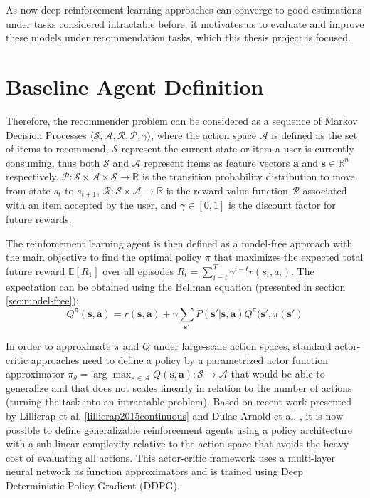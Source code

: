 As now deep reinforcement learning approaches can converge to good estimations under tasks considered intractable before, it motivates us to evaluate and improve these models under recommendation tasks, which this thesis project is focused.

\section{Baseline Agent Definition}
\label{sec:baseline}

Therefore, the recommender problem can be considered as a sequence of Markov Decision Processes $\langle \mathcal{S}, \mathcal{A}, \mathcal{R}, \mathcal{P}, \gamma \rangle$, where the action space $\mathcal{A}$ is defined as the set of items to recommend, $\mathcal{S}$ represent the current state or item a user is currently consuming, thus both $\mathcal{S}$ and $\mathcal{A}$ represent items as feature vectors $\mathbf{a}$ and $\mathbf{s} \in \mathbb{R}^n$ respectively. $\mathcal{P}: \mathcal{S} \times \mathcal{A} \times \mathcal{S} \rightarrow \mathbb{R}$ is the transition probability distribution to move from state ${s_t}$ to $s_{t+1}$,  $\mathcal{R}: \mathcal{S} \times \mathcal{A} \rightarrow \mathbb{R}$ is the reward value function $\mathcal{R}$ associated with an item accepted by the user, and $\gamma \in [0, 1]$ is the discount factor for future rewards. 

The reinforcement learning agent is then defined as a model-free approach with the main objective to find the optimal policy $\pi$ that maximizes the expected total future reward $\mathbb{E}[R_1]$ over all episodes $R_t = \sum^{T}_{i=t} \gamma^{i-t}r(s_i, a_i)$. The expectation can be obtained using the Bellman equation (presented in section \ref{sec:model-free}): 
\begin{equation}
Q^{\pi}(\mathbf{s}, \mathbf{a}) = r(\mathbf{s}, \mathbf{a}) + \gamma \sum_{\mathbf{s}'}P(\mathbf{s}'|\mathbf{s}, \mathbf{a}) Q^{\pi}(\mathbf{s}', \pi(\mathbf{s}')
\end{equation}

In order to approximate $\pi$ and $Q$ under large-scale action spaces, standard actor-critic approaches need to define a policy by a parametrized actor function approximator $\pi_{\theta} = \arg\max_{\mathbf{a \in \mathcal{A}}} Q(\mathbf{s}, \mathbf{a}) : \mathcal{S} \rightarrow \mathcal{A}$ that would be able to generalize and that does not scales linearly in relation to the number of actions (turning the task into an intractable problem). Based on recent work presented by Lillicrap et al. \ref{lillicrap2015continuous} and Dulac-Arnold et al. \cite{Dulac-Arnold2015}, it is now possible to define generalizable reinforcement agents using a policy architecture with a sub-linear complexity relative to the action space that avoids the heavy cost of evaluating all actions. This actor-critic framework uses a multi-layer neural network as function approximators and is trained using Deep Deterministic Policy Gradient (DDPG).

